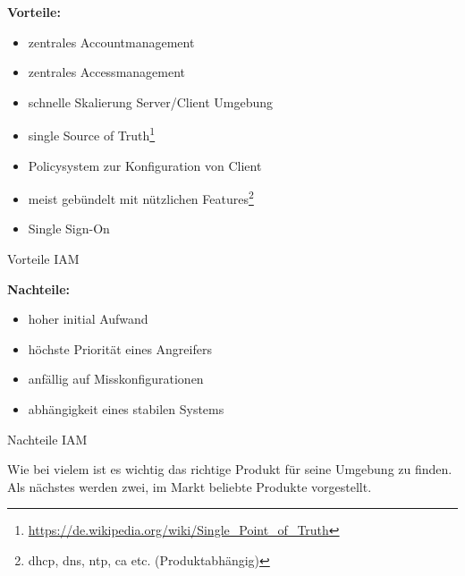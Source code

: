 \begin{minipage}{\linewidth}
    \begin{multicols}{2}
        \begin{table}[H]
            \begin{center}
                \textbf{Vorteile:}
                \begin{itemize}
                    \item zentrales Accountmanagement
                    \item zentrales Accessmanagement
                    \item schnelle Skalierung Server/Client Umgebung
                    \item single Source of Truth\footnote{\href{https://de.wikipedia.org/wiki/Single\_Point\_of\_Truth}{https://de.wikipedia.org/wiki/Single\_Point\_of\_Truth}}
                    \item Policysystem zur Konfiguration von Client
                    \item meist gebündelt mit nützlichen Features\footnote{\acrshort{dhcp}, \acrshort{dns}, \acrshort{ntp}, \acrshort{ca} etc. (Produktabhängig)}
                    \item Single Sign-On
                \end{itemize}
            \end{center}
            \caption{Vorteile IAM}
        \end{table}
        \begin{table}[H]
            \begin{center}
                \textbf{Nachteile:}
                \begin{itemize}
                    \item hoher initial Aufwand
                    \item höchste Priorität eines Angreifers
                    \item anfällig auf Misskonfigurationen
                    \item abhängigkeit eines stabilen Systems
                \end{itemize}
            \end{center}
            \caption{Nachteile IAM}
        \end{table}
    \end{multicols}
\end{minipage}

\vspace{1cm}
Wie bei vielem ist es wichtig das richtige Produkt für seine Umgebung zu finden. Als nächstes werden zwei, im Markt beliebte Produkte vorgestellt.

